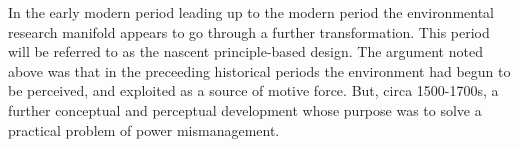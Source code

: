 \documentclass[a4paper, 12pt]{article}
\begin{document}
In the early modern period leading up to the modern period the environmental research manifold appears to go through a further transformation. This period will be referred to as the nascent principle-based design. The argument noted above was that in the preceeding historical periods the environment had begun to be perceived, and exploited as a source of motive force. But, circa 1500-1700s, a further conceptual and perceptual development whose purpose was to solve a practical problem of \SEs power mismanagement. 

    
\end{document}
